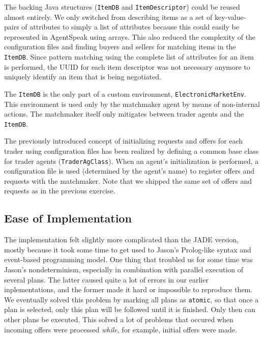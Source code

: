 \documentclass[a4paper,11pt]{article}
\begin{document}
\noindent The backing Java structures (\texttt{ItemDB} and \texttt{ItemDescriptor}) could be reused almost entirely. We only switched from describing items as a set of key-value-pairs of attributes to simply a list of attributes because this could easily be represented in AgentSpeak using arrays. This also reduced the complexity of the configuration files and finding buyers and sellers for matching items in the \texttt{ItemDB}. Since pattern matching using the complete list of attributes for an item is performed, the UUID for each item descriptor was not necessary anymore to uniquely identify an item that is being negotiated.

The \texttt{ItemDB} is the only part of a custom environment, \texttt{ElectronicMarketEnv}. This environment is used only by the matchmaker agent by means of non-internal actions. The matchmaker itself only mitigates between trader agents and the \texttt{ItemDB}.

The previously introduced concept of initializing requests and offers for each trader using configuration files has been realized by defining a common base class for trader agents (\texttt{TraderAgClass}). When an agent's initialization is performed, a configuration file is used (determined by the agent's name) to register offers and requests with the matchmaker. Note that we shipped the same set of offers and requests as in the previous exercise.


\subsection{Ease of Implementation}
The implementation felt slightly more complicated than the JADE version, mostly because it took some time to get used to Jason's Prolog-like syntax and event-based programming model. One thing that troubled us for some time was Jason's nondeterminism, especially in combination with parallel execution of several plans. The latter caused quite a lot of errors in our earlier inplementations, and the former made it hard or impossible to reproduce them. We eventually solved this problem by marking all plans as \texttt{atomic}, so that once a plan is selected, only this plan will be followed until it is finished. Only then can other plans be executed. This solved a lot of problems that occured when incoming offers were processed \emph{while}, for example, initial offers were made.
\end{document}
